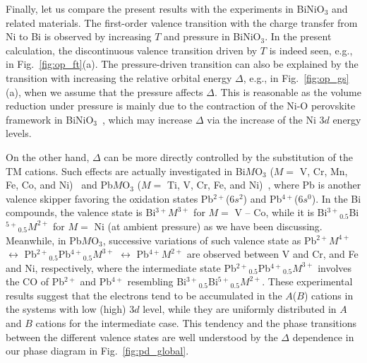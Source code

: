 \documentclass[aps,twocolumn,prl,showpacs,preprintnumbers,amsmath,amssymb]{revtex4}
\begin{document}
Finally, let us compare the present results with the experiments in BiNiO$_3$ and related materials. 
The first-order valence transition with the charge transfer from Ni to Bi is observed by increasing $T$ and pressure in BiNiO$_3$. 
In the present calculation, the discontinuous valence transition driven by $T$ is indeed seen, e.g., in Fig.~\ref{fig:op_ft}(a). 
The pressure-driven transition can also be explained by the transition with increasing the relative orbital energy $\Delta$, e.g., in Fig.~\ref{fig:op_gs}(a), when we assume that the pressure affects $\Delta$. 
This is reasonable as the volume reduction under pressure is mainly due to the contraction of the Ni-O perovskite framework in BiNiO$_3$~\cite{Azuma_nat}, which may increase $\Delta$ via the increase of the Ni $3d$ energy levels.

On the other hand, $\Delta$ can be more directly controlled by the substitution of the TM cations. 
Such effects are actually investigated in Bi$M$O$_3$ ($M=$ V, Cr, Mn, Fe, Co, and Ni)~\cite{BiCr, BiMn, BiFe, BiCo} and Pb$M$O$_3$ ($M=$ Ti, V, Cr, Fe, and Ni)~\cite{PbCr, PbNi}, where Pb is another valence skipper favoring the oxidation states Pb$^{2+}$($6s^{2}$) and Pb$^{4+}$($6s^{0}$). 
In the Bi compounds, the valence state is Bi$^{3+}M^{3+}$ for $M=$ V -- Co, while it is Bi${^{3+}}_{0.5}$Bi${^{5+}}_{0.5}M^{2+}$ for $M=$ Ni (at ambient pressure) as we have been discussing. 
Meanwhile, in Pb$M$O$_3$, successive variations of such valence state as Pb$^{2+}M^{4+}$ $\leftrightarrow$ Pb${^{2+}}_{0.5}$Pb${^{4+}}_{0.5}M^{3+}$ $\leftrightarrow$ Pb$^{4+}M^{2+}$ are observed 
between V and Cr, and Fe and Ni, respectively, 
where the intermediate state Pb${^{2+}}_{0.5}$Pb${^{4+}}_{0.5}M^{3+}$ involves the CO of Pb$^{2+}$ and Pb$^{4+}$ resembling Bi${^{3+}}_{0.5}$Bi${^{5+}}_{0.5}M^{2+}$. 
These experimental results suggest that the electrons tend to be accumulated in the $A$($B$) cations in the systems with low (high) $3d$ level, while they are uniformly distributed in $A$ and $B$ cations for the intermediate case. 
This tendency and the phase transitions between the different valence states are well understood by the $\Delta$ dependence in our phase diagram in Fig.~\ref{fig:pd_global}. 
\end{document}
